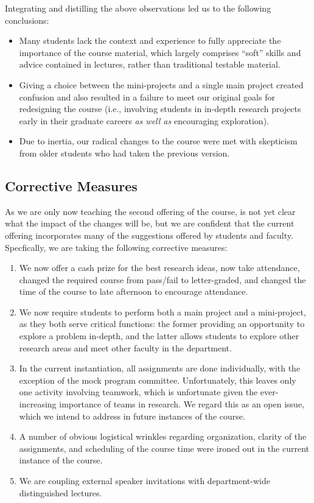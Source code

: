 Integrating and distilling the above observations led us to the
following conclusions:
\begin{itemize}
\itemsep=-1pt
\item Many students lack the context and experience to fully appreciate the
importance of the course material, which largely comprises ``soft''
skills and advice contained in lectures, rather than traditional
testable material.
\item Giving a choice between the mini-projects and a single main project
created confusion and also resulted in a failure to meet our original
goals for redesigning the course (i.e., involving students in in-depth
research projects early in their graduate careers {\em as well as}
encouraging exploration).
\item Due to inertia, our radical changes to the course were met with
  skepticism from older students who had taken the previous version.
\end{itemize}

\subsection{Corrective Measures}

As we are only now teaching the second offering of the course, is not
yet clear what the impact of the changes will be, but we are confident
that the current offering incorporates many of the suggestions offered
by students and faculty.  Specfically, we are taking the following
corrective measures:
\begin{enumerate}
\itemsep=-1pt
\item We now offer a cash prize for the best research ideas, now take
attendance, changed the required course from pass/fail to letter-graded,
and changed the time of the course to late afternoon to encourage
attendance.
\item We now require students to perform both a main project and a
mini-project, as they both serve critical functions: the former
providing an opportunity to explore a problem in-depth, and the latter
allows students to explore other research areas and meet other faculty
in the department.
\item In the current instantiation, all assignments are done individually,
with the exception of the mock program committee.  Unfortunately, this
leaves only one activity involving teamwork, which is unfortunate given
the ever-increasing importance of teams in research.  We regard this as
an open issue, which we intend to address in future instances of the
course.
\item A number of obvious logistical wrinkles regarding organization, clarity
of the assignments, and scheduling of the course time were ironed out in
the current instance of the course.
\item We are coupling external speaker invitations with department-wide
distinguished lectures.
\end{enumerate}

